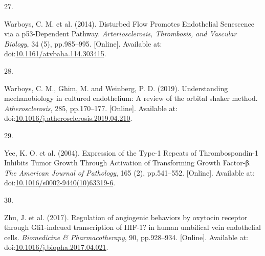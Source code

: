 \documentclass[
  11pt,
]{article}
\newlength{\cslhangindent}
\newlength{\csllabelwidth}
\newlength{\cslentryspacingunit} %
\newenvironment{CSLReferences}[2] %
 {%
  \setlength{\parindent}{0pt}
  \ifodd #1
  \let\oldpar\par
  \def\par{\hangindent=\cslhangindent\oldpar}
  \fi
  \setlength{\parskip}{#2\cslentryspacingunit}
 }%
 {}
\newcommand{\CSLLeftMargin}[1]{\parbox[t]{\csllabelwidth}{#1}}
\newcommand{\CSLRightInline}[1]{\parbox[t]{\linewidth - \csllabelwidth}{#1}\break}
\begin{document}
\begin{CSLReferences}{0}{0}
\leavevmode{}%
\CSLLeftMargin{27. }
\CSLRightInline{Warboys, C. M. {et al.} (2014). {Disturbed Flow Promotes Endothelial Senescence via a p53-Dependent Pathway}. \emph{Arteriosclerosis, Thrombosis, and Vascular Biology}, 34 (5), pp.985--995. {[}Online{]}. Available at: doi:\href{https://doi.org/10.1161/atvbaha.114.303415}{10.1161/atvbaha.114.303415}.}

\leavevmode{}%
\CSLLeftMargin{28. }
\CSLRightInline{Warboys, C. M., Ghim, M. and Weinberg, P. D. (2019). {Understanding mechanobiology in cultured endothelium: A review of the orbital shaker method}. \emph{Atherosclerosis}, 285, pp.170--177. {[}Online{]}. Available at: doi:\href{https://doi.org/10.1016/j.atherosclerosis.2019.04.210}{10.1016/j.atherosclerosis.2019.04.210}.}

\leavevmode{}%
\CSLLeftMargin{29. }
\CSLRightInline{Yee, K. O. {et al.} (2004). {Expression of the Type-1 Repeats of Thrombospondin-1 Inhibits Tumor Growth Through Activation of Transforming Growth Factor-β}. \emph{The American Journal of Pathology}, 165 (2), pp.541--552. {[}Online{]}. Available at: doi:\href{https://doi.org/10.1016/s0002-9440(10)63319-6}{10.1016/s0002-9440(10)63319-6}.}

\leavevmode{}%
\CSLLeftMargin{30. }
\CSLRightInline{Zhu, J. {et al.} (2017). {Regulation of angiogenic behaviors by oxytocin receptor through Gli1-indcued transcription of HIF-1? in human umbilical vein endothelial cells}. \emph{Biomedicine \& Pharmacotherapy}, 90, pp.928--934. {[}Online{]}. Available at: doi:\href{https://doi.org/10.1016/j.biopha.2017.04.021}{10.1016/j.biopha.2017.04.021}.}

\end{CSLReferences}
\end{document}
